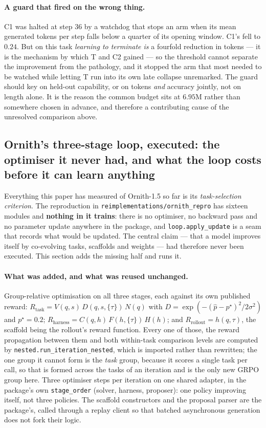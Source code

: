 \paragraph{A guard that fired on the wrong thing.} C1 was halted at step $36$ by a watchdog
that stops an arm when its mean generated tokens per step falls below a quarter of its opening
window. C1's fell to $0.24$. But on this task \emph{learning to terminate is} a fourfold
reduction in tokens --- it is the mechanism by which T and C2 gained --- so the threshold
cannot separate the improvement from the pathology, and it stopped the arm that most needed to
be watched while letting T run into its own late collapse unremarked. The guard should key on
held-out capability, or on tokens \emph{and} accuracy jointly, not on length alone. It is the
reason the common budget sits at $6.95$M rather than somewhere chosen in advance, and therefore
a contributing cause of the unresolved comparison above.

\subsection{Ornith's three-stage loop, executed: the optimiser it never had, and what the
loop costs before it can learn anything}
\label{sec:ornithloop}

Everything this paper has measured of Ornith-1.5 so far is its \emph{task-selection
criterion}. The reproduction in \texttt{reimplementations/ornith\_repro} has sixteen modules
and \textbf{nothing in it trains}: there is no optimiser, no backward pass and no parameter
update anywhere in the package, and \texttt{loop.apply\_update} is a seam that records what
would be updated. The central claim --- that a model improves itself by co-evolving tasks,
scaffolds and weights --- had therefore never been executed. This section adds the missing
half and runs it.

\paragraph{What was added, and what was reused unchanged.} Group-relative optimisation on all
three stages, each against its own published reward:
$R_{\mathrm{task}} = V(q,s)\,D(q,s,\{\tau\})\,N(q)$ with
$D=\exp(-(\hat p-p^\star)^2/2\sigma^2)$ and $p^\star=0.2$;
$R_{\mathrm{harness}} = C(q,h)\,F(h,\{\tau\})\,H(h)$; and
$R_{\mathrm{rollout}} = h(q,\tau)$, the scaffold being the rollout's reward function.
Every one of those, the reward propagation between them and both within-task comparison
levels are computed by \texttt{nested.run\_iteration\_nested}, which is imported rather than
rewritten; the one group it cannot form is the \emph{task} group, because it scores a single
task per call, so that is formed across the tasks of an iteration and is the only new GRPO
group here. Three optimiser steps per iteration on one shared adapter, in the package's own
\texttt{stage\_order} (solver, harness, proposer): one policy improving itself, not three
policies. The scaffold constructors and the proposal parser are the package's, called through
a replay client so that batched asynchronous generation does not fork their logic.

